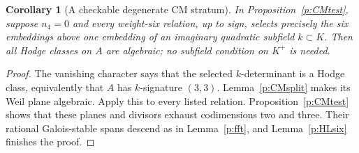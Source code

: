 \documentclass[10pt,reqno]{article}
\theoremstyle{emphasizedplain}
\newtheorem{corollary}[theorem]{Corollary}
\theoremstyle{emphasizeddefinition}
\theoremstyle{emphasizeddefinition}
\begin{document}
\begin{corollary}[A checkable degenerate CM stratum]\label{p:CMquartic}
In Proposition~\ref{p:CMtest}, suppose $n_4=0$ and every weight-six
relation, up to sign, selects precisely the six embeddings above one
embedding of an imaginary quadratic subfield $k\subset K$.
Then all Hodge classes on $A$ are algebraic; no subfield condition
on $K^+$ is needed.
\end{corollary}
\begin{proof}
The vanishing character says that the selected $k$-determinant is a
Hodge class, equivalently that $A$ has $k$-signature $(3,3)$.
Lemma~\ref{p:CMsplit} makes its Weil plane algebraic. Apply this
to every listed relation. Proposition~\ref{p:CMtest} shows that these
planes and divisors exhaust codimensions two and three. Their rational
Galois-stable spans descend as in Lemma~\ref{p:fft}, and
Lemma~\ref{p:HLsix} finishes the proof.
\end{proof}
\end{document}
